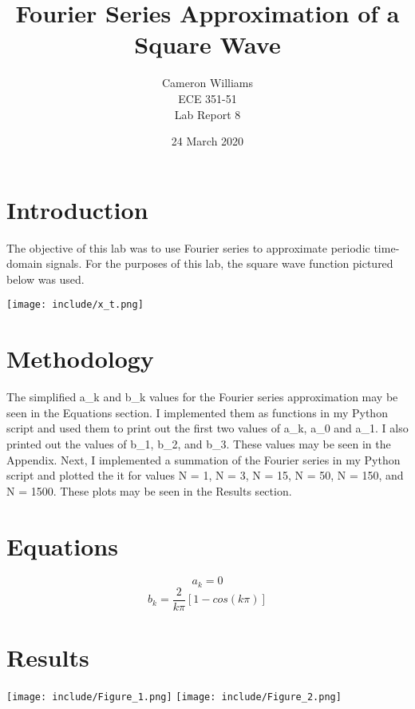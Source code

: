 \documentclass[12pt]{article}
\title{Fourier Series Approximation of a Square Wave}
\author{Cameron Williams\\ECE 351-51\\Lab Report 8}
\date{24 March 2020}
\begin{document}
\vspace{\fill}
\maketitle
\vspace{\fill}
\clearpage

\newpage
\section{Introduction}
    \par The objective of this lab was to use Fourier series to approximate periodic time-domain signals. For the purposes of this lab, the square wave function pictured below was used.
    \newline
    \begin{center}
    \texttt{[image: include/x\_t.png]}
    \end{center}
    
\newpage

\section{Methodology}
    \par The simplified a\_k and b\_k values for the Fourier series approximation may be seen in the Equations section. I implemented them as functions in my Python script and used them to print out the first two values of a\_k, a\_0 and a\_1. I also printed out the values of b\_1, b\_2, and b\_3. These values may be seen in the Appendix. Next, I implemented a summation of the Fourier series in my Python script and plotted the it for values N = 1, N = 3, N = 15, N = 50, N = 150, and N = 1500. These plots may be seen in the Results section.
    
\section{Equations}
    $$ a_k = 0 $$
    $$ b_k = \frac{2}{k\pi}[1 - cos(k\pi)] $$
    
\newpage
\section*{Results}
\begin{center}
    \texttt{[image: include/Figure\_1.png]}
    \texttt{[image: include/Figure\_2.png]}
\end{center}
\end{document}
